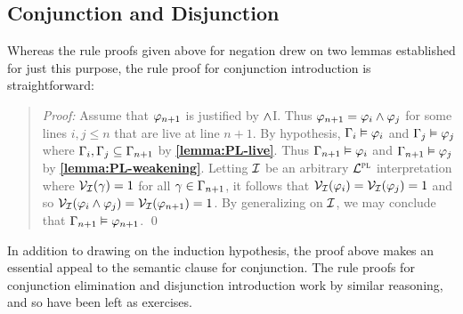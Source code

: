 \subsection{Conjunction and Disjunction}%
  \label{sub:ConjunctionDisjunction}

Whereas the rule proofs given above for negation drew on two lemmas established for just this purpose, the rule proof for conjunction introduction is straightforward:

  
\begin{quote} 
  \textit{Proof:} Assume that $\varphi_{n+1}$ is justified by $\wedge$I.
  Thus $\varphi_{n+1}=\varphi_i\wedge\varphi_j$ for some lines $i,j\leq n$ that are live at line $n+1$.
  By hypothesis, $\Gamma_i\vDash \varphi_i$ and $\Gamma_j\vDash \varphi_j$ where $\Gamma_i,\Gamma_j\subseteq \Gamma_{n+1}$ by \textbf{\ref{lemma:PL-live}}.
  Thus $\Gamma_{n+1} \vDash \varphi_i$ and $\Gamma_{n+1} \vDash \varphi_j$ by \textbf{\ref{lemma:PL-weakening}}.
  Letting $\mathcal{I}$ be an arbitrary $\mathcal{L}^{\textsc{pl}}$ interpretation where $\mathcal{V}_{\mathcal{I}}(\gamma) = 1$ for all $\gamma \in \Gamma_{n+1}$, it follows that $\mathcal{V}_{\mathcal{I}}(\varphi_i) = \mathcal{V}_{\mathcal{I}}(\varphi_j) = 1$ and so $\mathcal{V}_{\mathcal{I}}(\varphi_i \wedge \varphi_j) = \mathcal{V}_{\mathcal{I}}(\varphi_{n+1}) = 1$.
  By generalizing on $\mathcal{I}$, we may conclude that $\Gamma_{n+1} \vDash \varphi_{n+1}$.
  \qed
\end{quote}

In addition to drawing on the induction hypothesis, the proof above makes an essential appeal to the semantic clause for conjunction.
The rule proofs for conjunction elimination and disjunction introduction work by similar reasoning, and so have been left as exercises.


